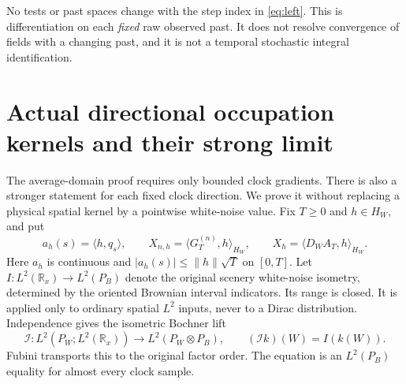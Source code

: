 \documentclass[11pt]{article}
\newcommand{\R}{\mathbb R}\newcommand{\E}{\mathbb E}
\begin{document}
No tests or past spaces change with the step index in
\eqref{eq:left}. This is differentiation on each \emph{fixed} raw
observed past. It does not resolve convergence of fields with a changing
past, and it is not a temporal stochastic integral identification.


\section{Actual directional occupation kernels and their strong limit}
The average-domain proof requires only bounded clock gradients. There is
also a stronger statement for each fixed clock direction. We prove it
without replacing a physical spatial kernel by a pointwise white-noise
value. Fix $T\geq0$ and $h\in H_W$, and put
\[
 a_h(s)=\langle h,q_s\rangle,\qquad
 X_{n,h}=\langle G_T^{(n)},h\rangle_{H_W},\qquad
 X_h=\langle D_WA_T,h\rangle_{H_W}.
\]
Here $a_h$ is continuous and $|a_h(s)|\leq\|h\|\sqrt T$ on $[0,T]$.
Let $I:L^2(\R_x)\to L^2(P_B)$ denote the original scenery white-noise
isometry, determined by the oriented Brownian interval indicators.
Its range is closed. It is applied only to ordinary spatial $L^2$
inputs, never to a Dirac distribution. Independence gives the isometric
Bochner lift
\[
 \mathcal I:L^2(P_W;L^2(\R_x))\longrightarrow L^2(P_W\otimes P_B),
 \qquad(\mathcal I k)(W)=I(k(W)).
\]
Fubini transports this to the original factor order. The equation is
an $L^2(P_B)$ equality for almost every clock sample.
\end{document}
